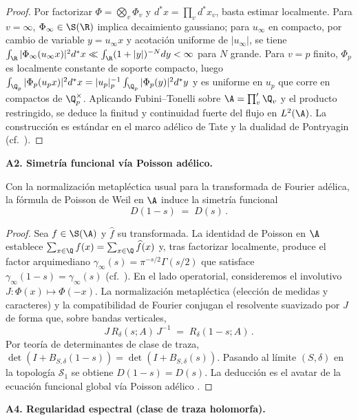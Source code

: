 \begin{proof}
Por factorizar $\Phi=\bigotimes_v \Phi_v$ y $d^\ast x=\prod_v d^\ast x_v$, basta estimar localmente.
Para $v=\infty$, $\Phi_\infty\in \S(\R)$ implica decaimiento gaussiano; para $u_\infty$ en compacto,
por cambio de variable $y=u_\infty x$ y acotación uniforme de $|u_\infty|$, se tiene
$\int_\R|\Phi_\infty(u_\infty x)|^2 d^\ast x \ll \int_\R (1+|y|)^{-N}dy<\infty$ para $N$ grande.
Para $v=p$ finito, $\Phi_p$ es localmente constante de soporte compacto,
luego $\int_{\Q_p}|\Phi_p(u_p x)|^2 d^\ast x = |u_p|_p^{-1}\int_{\Q_p}|\Phi_p(y)|^2 d^\ast y$
y es uniforme en $u_p$ que corre en compactos de $\Q_p^\times$.
Aplicando Fubini–Tonelli sobre $\A=\prod'_v \Q_v$ y el producto restringido, se deduce la
finitud y continuidad fuerte del flujo en $L^2(\A)$.
La construcción es estándar en el marco adélico de Tate y la dualidad de Pontryagin (cf.~\cite{tate1967,Weil1964}).
\end{proof}

\bigskip
\noindent\textbf{A2. Simetría funcional vía Poisson adélico.}

\begin{lemma}[A2: simetría $D(1-s)=D(s)$]\label{lem:A2}
Con la normalización metapléctica usual para la transformada de Fourier adélica,
la fórmula de Poisson de Weil en $\A$ induce la simetría funcional
\[
D(1-s)\;=\;D(s)\,.
\]
\end{lemma}

\begin{proof}
Sea $f\in \S(\A)$ y $\widehat f$ su transformada. La identidad de Poisson en $\A$ establece
$\sum_{x\in \Q} f(x)=\sum_{x\in \Q}\widehat f(x)$ y, tras factorizar localmente, produce el
factor arquimediano $\gamma_\infty(s)=\pi^{-s/2}\Gamma(s/2)$ que satisface $\gamma_\infty(1-s)=\gamma_\infty(s)$
(cf.~\cite{Weil1964}).
En el lado operatorial, consideremos el involutivo $J: \Phi(x)\mapsto \Phi(-x)$.
La normalización metapléctica (elección de medidas y caracteres) y la compatibilidad de Fourier
conjugan el resolvente suavizado por $J$ de forma que, sobre bandas verticales,
\[
J\,R_\delta(s;A)\,J^{-1} \;=\; R_\delta(1-s;A)\,.
\]
Por teoría de determinantes de clase de traza, $\det(I+B_{S,\delta}(1-s))=\det(I+B_{S,\delta}(s))$.
Pasando al límite $(S,\delta)$ en la topología $\mathcal S_1$ se obtiene $D(1-s)=D(s)$.
La deducción es el avatar de la ecuación funcional global vía Poisson adélico \cite{tate1967,Weil1964}.
\end{proof}

\bigskip
\noindent\textbf{A4. Regularidad espectral (clase de traza holomorfa).}

